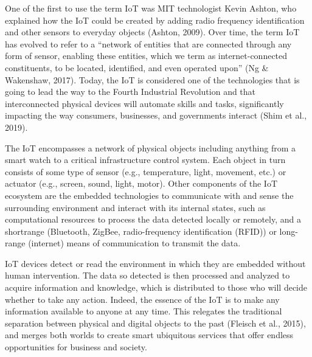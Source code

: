 \documentclass[
  letterpaper,
  DIV=11,
  numbers=noendperiod]{scrreprt}
\begin{document}
One of the first to use the term IoT was MIT technologist Kevin Ashton,
who explained how the IoT could be created by adding radio frequency
identification and other sensors to everyday objects (Ashton, 2009).
Over time, the term IoT has evolved to refer to a ``network of entities
that are connected through any form of sensor, enabling these entities,
which we term as internet-connected constituents, to be located,
identified, and even operated upon'' (Ng \& Wakenshaw, 2017). Today, the
IoT is considered one of the technologies that is going to lead the way
to the Fourth Industrial Revolution and that interconnected physical
devices will automate skills and tasks, significantly impacting the way
consumers, businesses, and governments interact (Shim et al., 2019).

The IoT encompasses a network of physical objects including anything
from a smart watch to a critical infrastructure control system. Each
object in turn consists of some type of sensor (e.g., temperature,
light, movement, etc.) or actuator (e.g., screen, sound, light, motor).
Other components of the IoT ecosystem are the embedded technologies to
communicate with and sense the surrounding environment and interact with
its internal states, such as computational resources to process the data
detected locally or remotely, and a shortrange (Bluetooth, ZigBee,
radio-frequency identification (RFID)) or long-range (internet) means of
communication to transmit the data.

IoT devices detect or read the environment in which they are embedded
without human intervention. The data so detected is then processed and
analyzed to acquire information and knowledge, which is distributed to
those who will decide whether to take any action. Indeed, the essence of
the IoT is to make any information available to anyone at any time. This
relegates the traditional separation between physical and digital
objects to the past (Fleisch et al., 2015), and merges both worlds to
create smart ubiquitous services that offer endless opportunities for
business and society.
\end{document}
